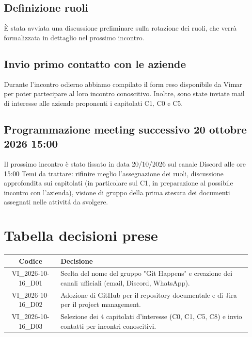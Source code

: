 \subsection{Definizione ruoli}
È stata avviata una discussione preliminare sulla rotazione dei ruoli, che verrà formalizzata in dettaglio nel prossimo incontro.

\subsection{Invio primo contatto con le aziende}
Durante l'incontro odierno abbiamo compilato il form reso disponibile da Vimar per poter partecipare al loro incontro conoscitivo. Inoltre, sono state inviate mail di interesse alle aziende proponenti i capitolati C1, C0 e C5.

\subsection{Programmazione meeting successivo 20 ottobre 2026 15:00}
Il prossimo incontro è stato fissato in data 20/10/2026 sul canale Discord alle ore 15:00 Temi da trattare: rifinire meglio l'assegnazione dei ruoli, discussione approfondita sui capitolati (in particolare sul C1, in preparazione al possibile incontro con l'azienda), visione di gruppo della prima stesura dei documenti assegnati nelle attivitá da svolgere.

\section{Tabella decisioni prese}

\renewcommand{\arraystretch}{1.3}
\noindent
\begin{tabularx}{\textwidth}{|c|>{\raggedright\arraybackslash}X|}
    \hline
    \textbf{Codice} & \textbf{Decisione} \\
    \hline
    VI\_2026-10-16\_D01 & Scelta del nome del gruppo "Git Happens" e creazione dei canali ufficiali (email, Discord, WhatsApp). \\
    \hline
    VI\_2026-10-16\_D02 & Adozione di GitHub per il repository documentale e di Jira per il project management. \\
    \hline
    VI\_2026-10-16\_D03 & Selezione dei 4 capitolati d'interesse (C0, C1, C5, C8) e invio contatti per incontri conoscitivi. \\
    \hline
\end{tabularx}
